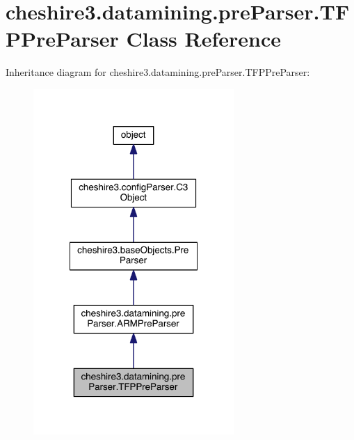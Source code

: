 \hypertarget{classcheshire3_1_1datamining_1_1pre_parser_1_1_t_f_p_pre_parser}{\section{cheshire3.\-datamining.\-pre\-Parser.\-T\-F\-P\-Pre\-Parser Class Reference}
\label{classcheshire3_1_1datamining_1_1pre_parser_1_1_t_f_p_pre_parser}
}


Inheritance diagram for cheshire3.\-datamining.\-pre\-Parser.\-T\-F\-P\-Pre\-Parser\-:
\nopagebreak
\begin{figure}[H]
\begin{center}
\leavevmode
\includegraphics[width=216pt]{classcheshire3_1_1datamining_1_1pre_parser_1_1_t_f_p_pre_parser__inherit__graph}
\end{center}
\end{figure}


